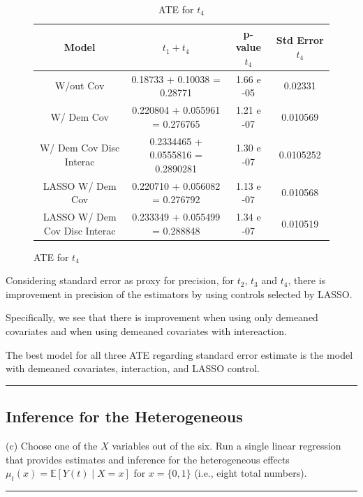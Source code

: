 \documentclass{article}
\newenvironment{colorparagraph}[1]{\par\color{#1}}{\par}
\begin{document}
\begin{figure}[H]
\begin{table}[H]
  \centering
  \small
  \begin{tabular}{|cccc|}
    \hline
    Model & $t_1 + t_4$ & p-value $t_4$ & Std Error $t_4$ \\
    \hline
    W/out Cov                & 0.18733 + 0.10038 = 0.28771 & 1.66 e -05          & 0.02331 \\
    W/ Dem Cov               & 0.220804 + 0.055961 = 0.276765 & 1.21 e -07       & 0.010569 \\ 
    W/ Dem Cov Disc Interac  & 0.2334465 + 0.0555816 = 0.2890281 & 1.30 e -07    & 0.0105252 \\   
    LASSO W/ Dem Cov               & 0.220710 + 0.056082 = 0.276792 & 1.13 e -07 & 0.010568 \\       
    LASSO W/ Dem Cov Disc Interac  & 0.233349 + 0.055499 = 0.288848 & 1.34 e -07 & 0.010519 \\       
    \hline
  \end{tabular}
  \caption{ATE for $t_4$}
\end{table}
\end{figure}

Considering standard error as proxy for precision, for $t_2$, $t_3$ and $t_4$, there is improvement in precision of the estimators by using controls selected by LASSO.

Specifically, we see that there is improvement when using only demeaned covariates and when using demeaned covariates with intereaction.

The best model for all three ATE regarding standard error estimate is the model with demeaned covariates, interaction, and LASSO control.

\begin{colorparagraph}{questioncolor}
\label{q3c}
\rule{\textwidth}{0.5pt}
\subsection{Inference for the Heterogeneous}
(c) Choose one of the \( X \) variables out of the six. Run a single linear regression that provides estimates and inference for the heterogeneous effects \( \mu_t(x) = \mathbb{E}[Y(t) \mid X = x] \) for \( x = \{0, 1\} \) (i.e., eight total numbers).

\rule{\textwidth}{0.5pt}
\end{colorparagraph}
\end{document}
